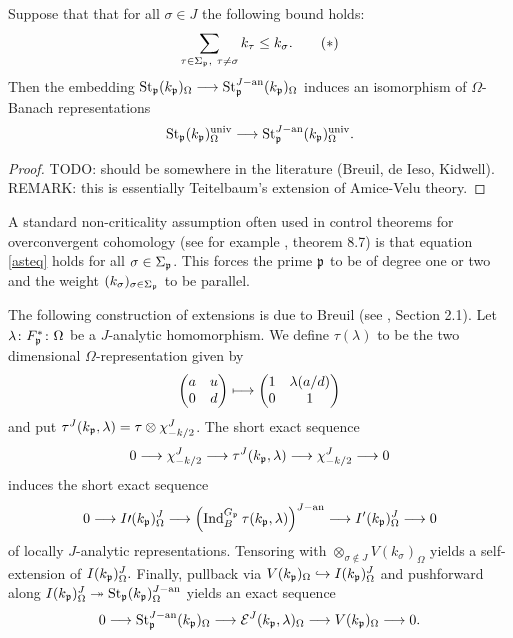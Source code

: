 \begin{Pro}\label{AmiceVelu}
Suppose that that for all $\sigma\in J$ the following bound holds:
\begin{align*}
\sum_{\tau\in \Sigma_{\mathfrak{p}},\ \tau\neq\sigma}k_\tau \leq k_\sigma.  \tag{\textasteriskcentered} \label{asteq}
\end{align*}
Then the embedding $\operatorname{St}_{\mathfrak{p}}(k_{\mathfrak{p}})_\Omega\longrightarrow \operatorname{St}_{\mathfrak{p}}^{J-\operatorname{an}}(k_{\mathfrak{p}})_\Omega$ induces an isomorphism of $\Omega$-Banach representations
$$\operatorname{St}_{\mathfrak{p}}(k_{\mathfrak{p}})_\Omega^{\operatorname{univ}}\longrightarrow \operatorname{St}_{\mathfrak{p}}^{J-\operatorname{an}}(k_{\mathfrak{p}})_\Omega^{\operatorname{univ}}.$$
\end{Pro}
\begin{proof}
TODO: should be somewhere in the literature (Breuil, de Ieso, Kidwell).
REMARK: this is essentially Teitelbaum's extension of Amice-Velu theory.
\end{proof}

\begin{Rem}
A standard non-criticality assumption often used in control theorems for overconvergent cohomology (see for example \cite{BWi0}, theorem 8.7) is that equation \eqref{asteq} holds for all $\sigma\in\Sigma_{\mathfrak{p}}$.
This forces the prime $\mathfrak{p}$ to be of degree one or two and the weight $(k_\sigma)_{\sigma\in\Sigma_{\mathfrak{p}}}$ to be parallel. 
\end{Rem}

The following construction of extensions is due to Breuil (see \cite{Br}, Section 2.1).
Let $\lambda\colon F_{\mathfrak{p}}^{\ast}\colon\Omega$ be a $J$-analytic homomorphism.
We define $\tau(\lambda)$ to be the two dimensional $\Omega$-representation given by
$$\begin{pmatrix} a & u \\ 0 & d \end{pmatrix} \longmapsto \begin{pmatrix} 1 & \lambda(a/d) \\ 0 & 1 \end{pmatrix} $$
and put $\tau^J(k_{\mathfrak{p}} ,\lambda)=\tau\otimes \chi^J_{-k/2}$.
The short exact sequence
$$0 \longrightarrow\chi^J_{-k/2}\longrightarrow \tau^J(k_{\mathfrak{p}} ,\lambda) \longrightarrow \chi^J_{-k/2}\longrightarrow 0$$
induces the short exact sequence
$$0 \longrightarrow I\prime(k_{\mathfrak{p}})^J_{\Omega}\longrightarrow \left(\operatorname{Ind}_{B}^{G_{\mathfrak{p}}}\tau(k_{\mathfrak{p}} ,\lambda)\right)^{J-\operatorname{an}} \longrightarrow I^\prime(k_{\mathfrak{p}})^J_{\Omega}\longrightarrow 0 $$
of locally $J$-analytic representations.
Tensoring with $\otimes_{\sigma\notin J}V(k_\sigma)_\Omega$ yields a self-extension of $I(k_{\mathfrak{p}})^J_{\Omega}.$
Finally, pullback via $V(k_{\mathfrak{p}})_\Omega\hookrightarrow I(k_{\mathfrak{p}})^J_\Omega$ and pushforward along $I(k_{\mathfrak{p}})^J_\Omega\twoheadrightarrow \operatorname{St}_{\mathfrak{p}}(k_{\mathfrak{p}})^{J-\operatorname{an}}_\Omega$ yields an exact sequence
\begin{align}\label{extension}
0 \longrightarrow \operatorname{St}_{\mathfrak{p}}^{J-\operatorname{an}}(k_{\mathfrak{p}})_\Omega\longrightarrow \mathcal{E}^{J}(k_{\mathfrak{p}} ,\lambda)_\Omega\longrightarrow V(k_{\mathfrak{p}})_\Omega\longrightarrow 0.
\end{align}

